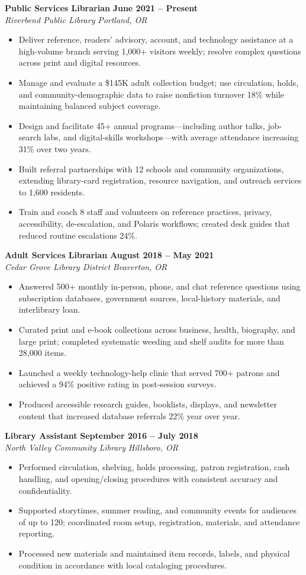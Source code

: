 \documentclass[10pt,letterpaper]{article}
\newcommand{\job}[4]{%
  \textbf{#1} \hfill \textbf{#2}\\[-1pt]
  \textit{#3} \hfill \textit{\color{muted}#4}\par
}
\begin{document}
\job{Public Services Librarian}{June 2021 -- Present}{Riverbend Public Library}{Portland, OR}
\begin{itemize}
  \item Deliver reference, readers' advisory, account, and technology assistance at a high-volume branch serving 1,000+ visitors weekly; resolve complex questions across print and digital resources.
  \item Manage and evaluate a \$145K adult collection budget; use circulation, holds, and community-demographic data to raise nonfiction turnover 18\% while maintaining balanced subject coverage.
  \item Design and facilitate 45+ annual programs---including author talks, job-search labs, and digital-skills workshops---with average attendance increasing 31\% over two years.
  \item Built referral partnerships with 12 schools and community organizations, extending library-card registration, resource navigation, and outreach services to 1,600 residents.
  \item Train and coach 8 staff and volunteers on reference practices, privacy, accessibility, de-escalation, and Polaris workflows; created desk guides that reduced routine escalations 24\%.
\end{itemize}

\vspace{1pt}
\job{Adult Services Librarian}{August 2018 -- May 2021}{Cedar Grove Library District}{Beaverton, OR}
\begin{itemize}
  \item Answered 500+ monthly in-person, phone, and chat reference questions using subscription databases, government sources, local-history materials, and interlibrary loan.
  \item Curated print and e-book collections across business, health, biography, and large print; completed systematic weeding and shelf audits for more than 28,000 items.
  \item Launched a weekly technology-help clinic that served 700+ patrons and achieved a 94\% positive rating in post-session surveys.
  \item Produced accessible research guides, booklists, displays, and newsletter content that increased database referrals 22\% year over year.
\end{itemize}

\vspace{1pt}
\job{Library Assistant}{September 2016 -- July 2018}{North Valley Community Library}{Hillsboro, OR}
\begin{itemize}
  \item Performed circulation, shelving, holds processing, patron registration, cash handling, and opening/closing procedures with consistent accuracy and confidentiality.
  \item Supported storytimes, summer reading, and community events for audiences of up to 120; coordinated room setup, registration, materials, and attendance reporting.
  \item Processed new materials and maintained item records, labels, and physical condition in accordance with local cataloging procedures.
\end{itemize}
\end{document}
